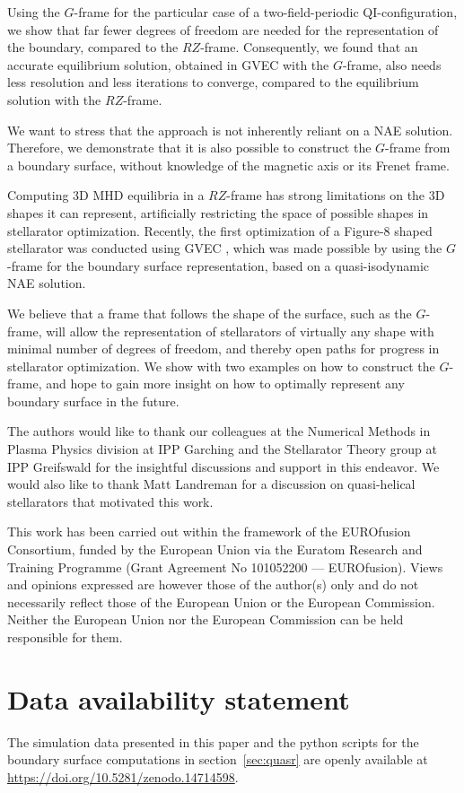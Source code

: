 \documentclass[12pt]{iopart}
\newcommand\hladdedrev[1]{#1} %
\newcommand\hlchangedrev[1]{#1} %
\newcommand\GFF{$G$-frame}
\newcommand\RZF{$RZ$-frame}
\begin{document}
Using the \GFF{} for the particular case of a two-field-periodic QI-configuration, we show that far fewer degrees of freedom are needed for the representation of the boundary, compared to the \RZF{}. Consequently, we found that an accurate equilibrium solution, obtained in GVEC with the \GFF{}, also needs less resolution and less iterations to converge, compared to the equilibrium solution with the \RZF{}.

\hladdedrev{We want to stress that the approach is not inherently reliant on a NAE solution. Therefore, we demonstrate that it is also possible to construct the \GFF{} from a boundary surface, without knowledge of the magnetic axis or its Frenet frame.}

Computing 3D MHD equilibria in a \RZF{} has strong limitations on the 3D shapes it can represent, artificially restricting the space of possible shapes in stellarator optimization. \hladdedrev{Recently, the first optimization of a Figure-8 shaped stellarator was conducted using GVEC  \cite{plunk2024figure8}, which was made possible by using the \GFF{} for the boundary surface representation, based on a quasi-isodynamic NAE solution.}

\hlchangedrev{We believe that a frame that follows the shape of the surface, such as the \GFF{}, will allow the representation of stellarators of virtually any shape with minimal number of degrees of freedom, and thereby open paths for progress in stellarator optimization. We show with two examples on how to construct the \GFF, and hope to gain more insight on how to optimally represent any boundary surface in the future.}


\ack 
The authors would like to thank our colleagues at the Numerical Methods in Plasma Physics division at IPP Garching and the Stellarator Theory group at IPP Greifswald for the insightful discussions and support in this endeavor. We would also like to thank Matt Landreman for a discussion on quasi-helical stellarators that motivated this work.

This work has been carried out within the framework of the EUROfusion Consortium, funded by the European Union via the Euratom Research and Training Programme (Grant Agreement No 101052200 — EUROfusion). Views and opinions expressed are however those of the author(s) only and do not necessarily reflect those of the European Union or the European Commission. Neither the European Union nor the European Commission can be held responsible for them.

\section*{Data availability statement}
\hlchangedrev{The simulation data presented in this paper and the python scripts for the boundary surface computations in section~\ref{sec:quasr} are openly available at 
\url{https://doi.org/10.5281/zenodo.14714598}.}
%
\end{document}
